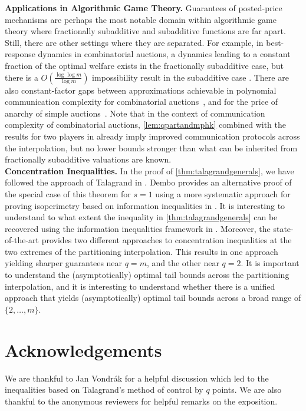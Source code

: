 \documentclass[11pt]{article}%
\numberwithin{theorem}{subsection}
\begin{document}
\noindent\textbf{Applications in Algorithmic Game Theory.} Guarantees of posted-price mechanisms are perhaps the most notable domain within algorithmic game theory where fractionally subadditive and subadditive functions are far apart. Still, there are other settings where they are separated. For example, in best-response dynamics in combinatorial auctions, a dynamics leading to a constant fraction of the optimal welfare exists in the fractionally subadditive case, but there is a $O(\frac{\log \log m}{\log m})$ impossibility result in the subadditive case \cite{DuttingK22}. There are also constant-factor gaps between approximations achievable in polynomial communication complexity for combinatorial auctions~\cite{DobzinskiNS10,Feige09,EzraFNTW19}, and for the price of anarchy of simple auctions~\cite{RoughgardenST16}. Note that in the context of communication complexity of combinatorial auctions, \cref{lem:qpartandmphk} combined with the results for two players in 
\cite{EzraFNTW19} already imply improved communication protocols across the interpolation, but no lower bounds stronger than what can be inherited from fractionally subadditive valuations are known.\\

\noindent\textbf{Concentration Inequalities.} In the proof of \cref{thm:talagrandgenerals}, we have followed the approach of Talagrand in \cite{Talagrand96}. Dembo provides an alternative proof of the special case of this theorem for $s = 1$ using a more systematic approach 
for proving isoperimetry
based on
information inequalities in \cite{Dembo97}. It is interesting to understand to what extent the inequality in \cref{thm:talagrandgenerals} can be recovered using the information inequalities framework in \cite{Dembo97}. Moreover, the state-of-the-art provides two different approaches to concentration inequalities at the two extremes of the partitioning interpolation. This results in one approach yielding sharper guarantees near $q=m$, and the other near $q=2$. It is important to understand the (asymptotically) optimal tail bounds across the partitioning interpolation, and it is interesting to understand whether there is a unified approach that yields (asymptotically) optimal tail bounds across a broad range of $\{2,\ldots, m\}$.

\section*{Acknowledgements}
We are thankful to Jan Vondr{\'a}k for a helpful discussion which led to the inequalities based on Talagrand's method of control by $q$ points. We are also thankful to the anonymous reviewers for helpful remarks on the exposition. 
\end{document}
